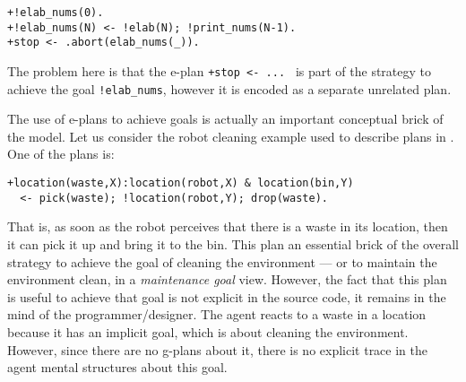 \begin{small}
\begin{verbatim}
+!elab_nums(0).
+!elab_nums(N) <- !elab(N); !print_nums(N-1).		
+stop <- .abort(elab_nums(_)).
\end{verbatim}
\end{small}

\noindent The problem here is that the e-plan \texttt{+stop <- ... } is
part of the strategy to achieve the goal \texttt{!elab\_nums}, however
it is encoded as a separate unrelated plan.


The use of e-plans to achieve goals is actually an important
conceptual brick of the {\asl} model.
%
Let us consider the robot cleaning example used to describe plans in
{\cite{Rao96}}.
%
One of the plans is:

\begin{small}
\begin{verbatim}
+location(waste,X):location(robot,X) & location(bin,Y)
  <- pick(waste); !location(robot,Y); drop(waste).
\end{verbatim}
\end{small}

\noindent That is, as soon as the robot perceives that there is a
waste in its location, then it can pick it up and bring it to the bin.
%
This plan an essential brick of the overall strategy to achieve the
goal of cleaning the environment --- or to maintain the environment
clean, in a \emph{maintenance goal} view.
%
However, the fact that this plan is useful to achieve that goal is not
explicit in the source code, it remains in the mind of the
programmer/designer.
%
%
%
%
%
The agent reacts to a waste in a location because it has an implicit
goal, which is about cleaning the environment.
%
However, since there are no g-plans about it, there is no explicit
trace in the agent mental structures about this goal.

